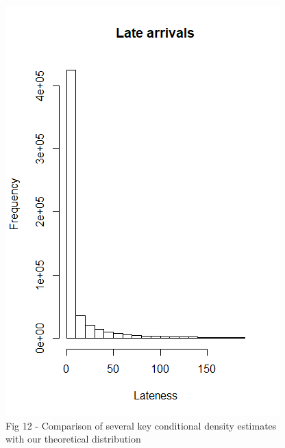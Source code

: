 \documentclass[12pt, a4paper]{book}
\begin{document}
			\begin{figure}
			\centering
	 		\includegraphics[width = .45 \textwidth]{../figures/LateArrivalsHistogram}
	 		\caption{Fig 12  - Comparison of several key conditional density estimates with our theoretical distribution}
	 		\end{figure}
\end{document}
